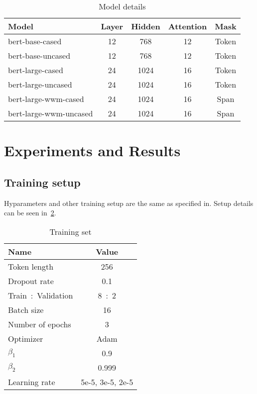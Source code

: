\documentclass{amsart}
\begin{document}
\begin{table}  
    \centering
    \caption{Model details}
    \label{tbl:model-details}
\begin{tabular}{ l  c  c  c  c }
    \toprule
    Model    & Layer  & Hidden  & Attention & Mask      \\
    \midrule
    bert-base-cased   & 12    & 768    & 12   & Token  \\
    bert-base-uncased   & 12    & 768    & 12   & Token \\
    bert-large-cased    & 24     & 1024    & 16  & Token \\
    bert-large-uncased   & 24    & 1024   & 16    & Token \\
    bert-large-wwm-cased  & 24    & 1024    & 16   & Span  \\
    bert-large-wwm-uncased & 24    & 1024    & 16    & Span \\
     \bottomrule
\end{tabular}
\end{table}


\section{Experiments and Results} \label{sec-experiments}

\subsection{Training setup}
Hyparameters and other training setup are the same as specified in. Setup details can be seen in~\cref{tbl:training-setup}.

\begin{table}  
    \centering
    \caption{Training set}
    \label{tbl:training-setup}
\begin{tabular}{ l  c }
    \toprule
    Name  & Value \\
    \midrule
    Token length   & 256     \\
	Dropout rate     & 0.1    \\
    Train\ :\ Validation         & 8\ :\ 2   \\
    Batch size         & 16   \\
	Number of epochs         & 3   \\
	Optimizer         & Adam      \\
	$\beta_1$          & 0.9    \\
	$\beta_2$         & 0.999   \\
    Learning rate   & 5e-5, 3e-5, 2e-5   \\
     \bottomrule
\end{tabular}
\end{table}
\end{document}
